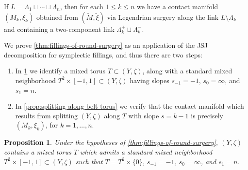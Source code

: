 \documentclass[11pt]{amsart}
\numberwithin{equation}{section}
\theoremstyle{plain}
\newtheorem{prop}[equation]{Proposition}%
\theoremstyle{definition}
\theoremstyle{remark}\newtheorem{rem}[equation]{Remark}%
\theoremstyle{remark}\newtheorem{obs}[equation]{Observation}%
\begin{document}
If $L=\Lambda_1\sqcup\cdots\sqcup\Lambda_n$, then for each $1\leq k\leq n$ we have a contact manifold $(M_k,\xi_k)$ obtained from $(\tilde{M},\tilde{\xi})$ via Legendrian surgery along the link $L\setminus\Lambda_k$ and containing a two-component link $\Lambda_k^+\sqcup\Lambda_k^-$.

We prove \cref{thm:fillings-of-round-surgery} as an application of the JSJ decomposition for symplectic fillings, and thus there are two steps:
\begin{enumerate}
    \item In \cref{prop:mixed-belt-torus} we identify a mixed torus $T\subset (Y,\zeta)$, along with a standard mixed neighborhood $T^2\times[-1,1]\subset (Y,\zeta)$ having slopes $s_{-1}=-1$, $s_0=\infty$, and $s_1=n$.
    \item In \cref{prop:splitting-along-belt-torus} we verify that the contact manifold which results from splitting $(Y,\zeta)$ along $T$ with slope $s=k-1$ is precisely $(M_{k},\xi_{k})$, for $k=1,\ldots,n$.
\end{enumerate}

\begin{prop}\label{prop:mixed-belt-torus}
Under the hypotheses of \cref{thm:fillings-of-round-surgery}, $(Y,\zeta)$ contains a mixed torus $T$ which admits a standard mixed neighborhood $T^2\times[-1,1]\subset (Y,\zeta)$ such that $T=T^2\times\{0\}$, $s_{-1}=-1$, $s_0=\infty$, and $s_1=n$.
\end{prop}
\end{document}
